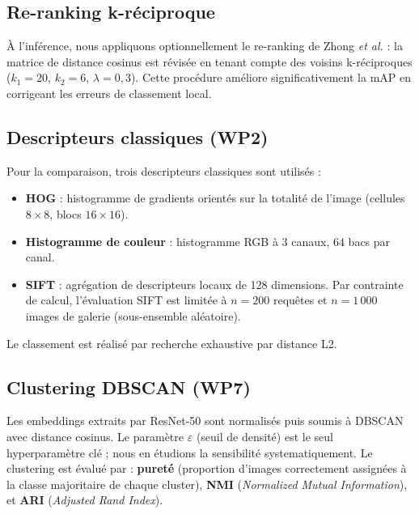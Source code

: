 \subsection{Re-ranking k-réciproque}

À l'inférence, nous appliquons optionnellement le re-ranking de Zhong \textit{et al.} \cite{zhong2017re} : la matrice de distance cosinus est révisée en tenant compte des voisins k-réciproques ($k_1=20$, $k_2=6$, $\lambda=0{,}3$). Cette procédure améliore significativement la mAP en corrigeant les erreurs de classement local.

\subsection{Descripteurs classiques (WP2)}

Pour la comparaison, trois descripteurs classiques sont utilisés :
\begin{itemize}
\item \textbf{HOG} \cite{dalal2005histograms} : histogramme de gradients orientés sur la totalité de l'image (cellules $8 \times 8$, blocs $16 \times 16$).
\item \textbf{Histogramme de couleur} : histogramme RGB à 3 canaux, 64 bacs par canal.
\item \textbf{SIFT} \cite{lowe2004distinctive} : agrégation de descripteurs locaux de 128 dimensions. Par contrainte de calcul, l'évaluation SIFT est limitée à $n=200$ requêtes et $n=1\,000$ images de galerie (sous-ensemble aléatoire).
\end{itemize}
Le classement est réalisé par recherche exhaustive par distance L2.

\subsection{Clustering DBSCAN (WP7)}

Les embeddings extraits par ResNet-50 sont normalisés puis soumis à DBSCAN \cite{ester1996density} avec distance cosinus. Le paramètre $\varepsilon$ (seuil de densité) est le seul hyperparamètre clé ; nous en étudions la sensibilité systematiquement. Le clustering est évalué par : \textbf{pureté} (proportion d'images correctement assignées à la classe majoritaire de chaque cluster), \textbf{NMI} (\textit{Normalized Mutual Information}), et \textbf{ARI} (\textit{Adjusted Rand Index}).
